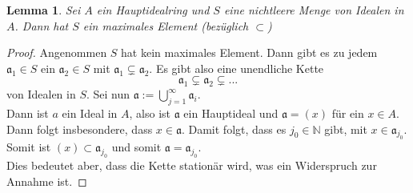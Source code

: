 \documentclass[10pt,a4paper]{article}
\newcommand{\N}{\ensuremath{\mathbb{N}}}
\theoremstyle{plain}
\newtheorem{lem}[theorem]{Lemma}
\theoremstyle{definition}
\theoremstyle{remark}
\begin{document}

	\begin{lem}
		Sei $A$ ein Hauptidealring und $S$ eine nichtleere Menge von Idealen in $A$. Dann hat $S$ ein maximales Element (bezüglich $\subset$)
	\end{lem}
	\begin{proof}
		Angenommen $S$ hat kein maximales Element. Dann gibt es zu jedem $\mathfrak a_1\in S$ ein $\mathfrak a_2\in S$ mit $\mathfrak a_1\subsetneq \mathfrak a_2$. Es gibt also eine unendliche Kette
		\[\mathfrak a_1\subsetneq \mathfrak a_2\subsetneq...\]
		von Idealen in $S$. Sei nun $\mathfrak a:=\bigcup_{j=1}^\infty \mathfrak a_i$.\\
		Dann ist $a$ ein Ideal in $A$, also ist $\mathfrak a$ ein Hauptideal und $\mathfrak a=(x)$ für ein $x\in A$.\\
		Dann folgt insbesondere, dass $x\in\mathfrak a$. Damit folgt, dass es $j_0\in\N$ gibt, mit $x\in \mathfrak a_{j_0}$.\\
		Somit ist $(x)\subset\mathfrak a_{j_0}$ und somit $\mathfrak a=\mathfrak a_{j_0}$.\\
		Dies bedeutet aber, dass die Kette stationär wird, was ein Widerspruch zur Annahme ist.
	\end{proof}
	
\end{document}
